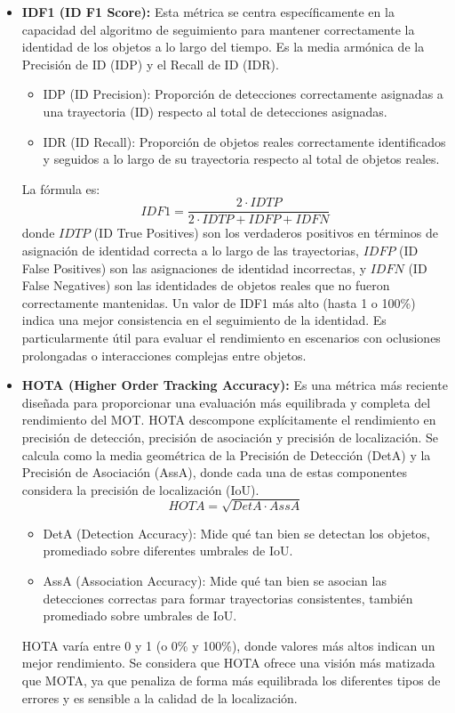 \documentclass[11pt,spanish,listoffigures,listoftables]{tfgetsinf}
\begin{document}
\begin{itemize}
   \item \textbf{IDF1 (ID F1 Score):} Esta métrica se centra específicamente en la capacidad del algoritmo de seguimiento para mantener correctamente la identidad de los objetos a lo largo del tiempo. Es la media armónica de la Precisión de ID (IDP) y el Recall de ID (IDR).
   \begin{itemize}
     \item IDP (ID Precision): Proporción de detecciones correctamente asignadas a una trayectoria (ID) respecto al total de detecciones asignadas.
     \item IDR (ID Recall): Proporción de objetos reales correctamente identificados y seguidos a lo largo de su trayectoria respecto al total de objetos reales.
   \end{itemize}
   La fórmula es:
   \begin{equation}
   IDF1 = \frac{2 \cdot IDTP}{2 \cdot IDTP + IDFP + IDFN}
   \end{equation}
   donde \(IDTP\) (ID True Positives) son los verdaderos positivos en términos de asignación de identidad correcta a lo largo de las trayectorias, \(IDFP\) (ID False Positives) son las asignaciones de identidad incorrectas, y \(IDFN\) (ID False Negatives) son las identidades de objetos reales que no fueron correctamente mantenidas. Un valor de IDF1 más alto (hasta 1 o 100\%) indica una mejor consistencia en el seguimiento de la identidad. Es particularmente útil para evaluar el rendimiento en escenarios con oclusiones prolongadas o interacciones complejas entre objetos.

   \item \textbf{HOTA (Higher Order Tracking Accuracy):} Es una métrica más reciente diseñada para proporcionar una evaluación más equilibrada y completa del rendimiento del MOT. HOTA descompone explícitamente el rendimiento en precisión de detección, precisión de asociación y precisión de localización. Se calcula como la media geométrica de la Precisión de Detección (DetA) y la Precisión de Asociación (AssA), donde cada una de estas componentes considera la precisión de localización (IoU).
   \begin{equation}
   HOTA = \sqrt{DetA \cdot AssA}
   \end{equation}
   \begin{itemize}
     \item DetA (Detection Accuracy): Mide qué tan bien se detectan los objetos, promediado sobre diferentes umbrales de IoU.
     \item AssA (Association Accuracy): Mide qué tan bien se asocian las detecciones correctas para formar trayectorias consistentes, también promediado sobre umbrales de IoU.
   \end{itemize}
   HOTA varía entre 0 y 1 (o 0\% y 100\%), donde valores más altos indican un mejor rendimiento. Se considera que HOTA ofrece una visión más matizada que MOTA, ya que penaliza de forma más equilibrada los diferentes tipos de errores y es sensible a la calidad de la localización.


\end{itemize}
\end{document}
